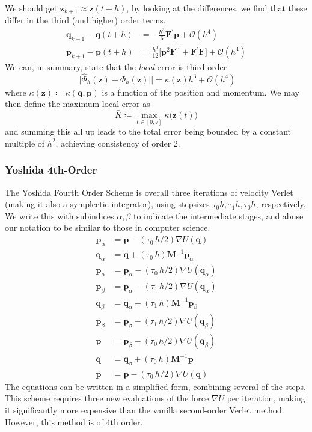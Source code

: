 \documentclass{article}
\theoremstyle{remark}
\theoremstyle{definition}
\begin{document}
We should get $\mathbf{z}_{k+1} \approx \mathbf{z}(t + h)$, by looking at the differences, we find that these differ in the third (and higher) order terms. 
\begin{align*}
    \mathbf{q}_{k+1} - \mathbf{q}(t + h) & = - \frac{h^3}{6} \mathbf{F}^\prime \mathbf{p} + \mathcal{O}(h^4) \\
    \mathbf{p}_{k+1} - \mathbf{p}(t + h) & = \frac{h^3}{12} \big[ \mathbf{p}^2 \mathbf{F}^{\prime\prime} + \mathbf{F}^\prime \mathbf{F} \big] + \mathcal{O}(h^4)
\end{align*}
We can, in summary, state that the \textit{local} error is third order
\[||\hat{\Phi}_h (\mathbf{z}) - \Phi_h (\mathbf{z})|| = \kappa(\mathbf{z}) h^3 + \mathcal{O}(h^4)\]
where $\kappa(\mathbf{z}) \coloneqq \kappa(\mathbf{q}, \mathbf{p})$ is a function of the position and momentum. We may then define the maximum local error as 
\[\bar{K} \coloneqq \max_{t \in [0, \tau]} \kappa \big(\mathbf{z}(t)\big)\]
and summing this all up leads to the total error being bounded by a constant multiple of $h^2$, achieving consistency of order 2. 

\subsubsection{Yoshida 4th-Order}
The Yoshida Fourth Order Scheme is overall three iterations of velocity Verlet (making it also a symplectic integrator), using stepsizes $\tau_0 h, \tau_1 h, \tau_0 h$, respectively. We write this with subindices $\alpha, \beta$ to indicate the intermediate stages, and abuse our notation to be similar to those in computer science. 
\begin{align*}
    \mathbf{p}_\alpha & = \mathbf{p} - (\tau_0\, h/2) \nabla U(\mathbf{q}) \\
    \mathbf{q}_\alpha & = \mathbf{q} + (\tau_0 \, h) \mathbf{M}^{-1} \mathbf{p}_\alpha \\
    \mathbf{p}_\alpha & = \mathbf{p}_\alpha - (\tau_0 \, h / 2) \nabla U(\mathbf{q}_\alpha) \\
    \mathbf{p}_\beta & = \mathbf{p}_\alpha - (\tau_1 \, h/2) \nabla U(\mathbf{q}_\alpha) \\
    \mathbf{q}_\beta & = \mathbf{q}_\alpha + (\tau_1 \, h) \mathbf{M}^{-1} \mathbf{p}_\beta \\
    \mathbf{p}_\beta & = \mathbf{p}_\beta - (\tau_1 \, h/2) \nabla U(\mathbf{q}_\beta) \\
    \mathbf{p} & = \mathbf{p}_\beta - (\tau_0 \, h/2) \nabla U(\mathbf{q}_\beta) \\
    \mathbf{q} & = \mathbf{q}_\beta + (\tau_0 \, h) \mathbf{M}^{-1} \mathbf{p} \\
    \mathbf{p} & = \mathbf{p} - (\tau_0 \, h/2) \nabla U(\mathbf{q}) 
\end{align*}
The equations can be written in a simplified form, combining several of the steps. This scheme requires three new evaluations of the force $\nabla U$ per iteration, making it significantly more expensive than the vanilla second-order Verlet method. However, this method is of 4th order. 
\end{document}
